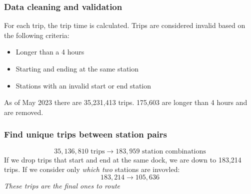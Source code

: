 \documentclass{beamer}
\begin{document}
\begin{frame}
    \frametitle{Data cleaning and validation}
    For each trip, the trip time is calculated.
    Trips are considered invalid based on the following criteria:
    \begin{itemize}
        \item Longer than a 4 hours


        \item Starting and ending at the same station


        \item Stations with an invalid start or end station

    \end{itemize}
    As of May 2023 there are 35,231,413 trips. 175,603 are longer than 4 hours and are removed.
\end{frame}

\begin{frame}
    \frametitle{Find unique trips between station pairs}
    $$ 35,136,810 \text{ trips} \rightarrow 183,959 \text{ station combinations} $$
    If we drop trips that start and end at the same dock, we are down to 183,214 trips.
    \smallskip
    If we consider only \emph{which two} stations are invovled:
    $$ 183,214 \rightarrow 105,636 $$
    \emph{These trips are the final ones to route}
\end{frame}
\end{document}
